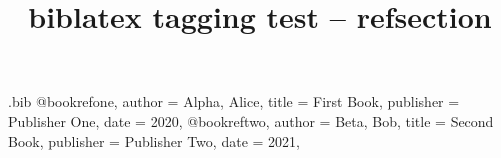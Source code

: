 \ifdefined\Uchar\RequirePackage{luatagging}\fi
{} %
\begin{filecontents*}[overwrite]{\jobname.bib}
	@book{refone,
		author    = {Alpha, Alice},
		title     = {First Book},
		publisher = {Publisher One},
		date      = {2020},
	}
	@book{reftwo,
		author    = {Beta, Bob},
		title     = {Second Book},
		publisher = {Publisher Two},
		date      = {2021},
	}
\end{filecontents*}
\documentclass{report}

\usepackage[backend=biber, style=authoryear, refsection=chapter]{biblatex}


\title{biblatex tagging test -- refsection}


	
	\chapter{One}
	*** REFSECTION AFTER CHAPTER ONE = \therefsection  %
	
	\cite{refone}
	
	\printbibliography[heading=subbibintoc,title={References}]
	
	\chapter{Two}
	*** REFSECTION AFTER CHAPTER TWO = \therefsection *** %
	
	\cite{reftwo}
	
	\printbibliography[heading=subbibintoc,title={References}]
	

